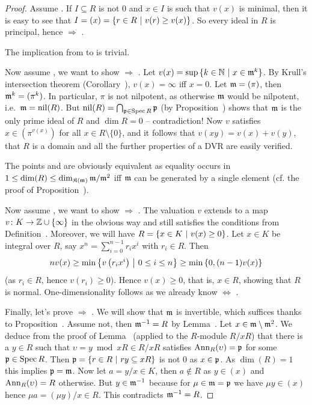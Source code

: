 \documentclass[a4paper,parskip=half,numbers=enddot, DIV=12]{scrreprt}
\begin{document}
\begin{proof}
    Assume . If $I\subseteq R$ is not $0$ and $x\in I$ is such that $v(x)$ is minimal, then it is easy to see that $I = (x) = \left\{r\in R\ \middle|\  v(r) \geq v(x)\right\}$. So every ideal in $R$ is principal, hence  $\Rightarrow$ .
    
    The implication from  to  is trivial.
    
    Now assume , we want to show  $\Rightarrow$ . Let $v(x) = \sup\left\{k\in \mathbb{N} \ \middle|\  x\in \smash{\mathfrak{m}^k}\right\}$. By Krull's intersection theorem (Corollary~), $v(x) = \infty$ iff $x=0$. Let $\mathfrak{m} = (\pi)$, then $\mathfrak{m}^k = (\pi^k)$. In particular, $\pi$ is not nilpotent, as otherwise $\mathfrak{m}$ would be nilpotent, i.e.\ $\mathfrak{m}=\operatorname{nil}(R)$. But $\operatorname{nil}(R)=\bigcap_{\mathfrak{p}\in\operatorname{Spec} R}\mathfrak{p}$ (by Proposition~) shows that $\mathfrak{m}$ is the only prime ideal of $R$ and $\dim R = 0$ -- contradiction! Now $v$ satisfies $x\in (\pi^{v(x)})$ for all $x\in R\setminus\{0\}$, and it follows that $v(xy) = v(x) + v(y)$, that $R$ is a domain and all the further properties of a DVR are easily verified.
    
    The points  and  are obviously equivalent as equality occurs in $1\leq\dim(R)\leq\dim_{\mathfrak{K}(\mathfrak{m})}\mathfrak{m}/\mathfrak{m}^2$ iff $\mathfrak{m}$ can be generated by a single element (cf. the proof of Proposition~).
    
    Now assume , we want to show  $\Rightarrow$ . The valuation $v$ extends to a map $v\colon K\morphism\IZ\cup\{\infty\}$ in the obvious way and still satisfies the conditions from Definition~. Moreover, we will have $R=\left\{x\in K\ \middle|\  v(x)\geq 0\right\}$. Let $x\in K$ be integral over $R$, say $x^n = \sum_{i=0}^{n-1} r_i x^i$ with $r_i \in R$. Then 
    \begin{align*}
    	nv(x) \geq \min \left \{v\left(r_ix^i\right)\ \middle|\  0\leq i\leq n\right\} \geq \min\left\{ 0, (n-1)v(x)\right\}
    \end{align*}
     (as $r_i\in R$, hence $v(r_i)\geq 0$). Hence $v(x)\geq 0$, that is, $x\in R$, showing that $R$ is normal. One-dimensionality follows as we already know  $\Leftrightarrow$ .
    
    Finally, let's prove  $\Rightarrow$ . We will show that $\mathfrak{m}$ is invertible, which suffices thanks to Proposition~. Assume not, then $\mathfrak{m}^{-1}=R$ by Lemma~. Let $x\in \mathfrak{m}\setminus \mathfrak{m}^2$. We deduce from the proof of Lemma~ (applied to the $R$-module $R/xR$) that there is a $y\in R$ such that $\upsilon = y\bmod xR\in R/xR$ satisfies $\operatorname{Ann}_R(\upsilon) = \mathfrak{p}$ for some $\mathfrak{p}\in \operatorname{Spec} R$. Then $\mathfrak{p} = \left\{r\in R\ \middle|\  ry\subseteq xR\right\}$ is not 0 as $x\in\mathfrak{p}$. As $\dim(R) = 1$ this implies $\mathfrak{p} = \mathfrak{m}$. Now let $a=y/x\in K$, then $a\not \in R$ as $y\in (x)$ and $\operatorname{Ann}_R(\upsilon)=R$ otherwise. But $y\in \mathfrak{m}^{-1}$ because for $\mu\in\mathfrak{m} = \mathfrak{p}$ we have $\mu y\in (x)$ hence $\mu a = (\mu y)/x\in R$. This contradicts $\mathfrak{m}^{-1}=R$.
\end{proof}
\end{document}
